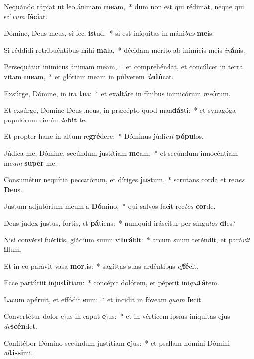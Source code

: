 \item Nequándo rápiat ut leo ánimam \textbf{me}am,~* dum non est qui rédimat, neque qui sal\textit{vum} \textbf{fá}\textbf{ci}at.
\item Dómine, Deus meus, si feci \textbf{is}tud.~* si est iníquitas in máni\textit{bus} \textbf{me}is:
\item Si réddidi retribuéntibus mihi \textbf{ma}la,~* décidam mérito ab inimícis meis \textit{in}\textbf{á}nis.
\item Persequátur inimícus ánimam meam,~† et comprehéndat, et concúlcet in terra vitam \textbf{me}am,~* et glóriam meam in púlverem \textit{de}\textbf{dú}cat.
\item Exsúrge, Dómine, in ira \textbf{tu}a:~* et exaltáre in fínibus inimicórum \textit{me}\textbf{ó}rum.
\item Et exsúrge, Dómine Deus meus, in præcépto quod man\textbf{dás}ti:~* et synagóga populórum circúm\textit{da}\textbf{bit} te.
\item Et propter hanc in altum re\textbf{gré}dere:~* Dóminus júdi\textit{cat} \textbf{pó}\textbf{pu}los.
\item Júdica me, Dómine, secúndum justítiam \textbf{me}am,~* et secúndum innocéntiam me\textit{am} \textbf{su}\textbf{per} me.
\item Consumétur nequítia peccatórum, et díriges \textbf{jus}tum,~* scrutans corda et re\textit{nes} \textbf{De}us.
\item Justum adjutórium meum a \textbf{Dó}mino,~* qui salvos facit rec\textit{tos} \textbf{cor}de.
\item Deus judex justus, fortis, et \textbf{pá}tiens:~* numquid iráscitur per síngu\textit{los} \textbf{di}es?
\item Nisi convérsi fuéritis, gládium suum vi\textbf{brá}bit:~* arcum suum teténdit, et pará\textit{vit} \textbf{il}lum.
\item Et in eo parávit vasa \textbf{mor}tis:~* sagíttas suas ardéntibus \textit{ef}\textbf{fé}cit.
\item Ecce partúriit injus\textbf{tí}tiam:~* concépit dolórem, et péperit ini\textit{qui}\textbf{tá}tem.
\item Lacum apéruit, et effódit \textbf{e}um:~* et íncidit in fóveam \textit{quam} \textbf{fe}cit.
\item Convertétur dolor ejus in caput \textbf{e}jus:~* et in vérticem ipsíus iníquitas ejus \textit{de}\textbf{scén}det.
\item Confitébor Dómino secúndum justítiam \textbf{e}jus:~* et psallam nómini Dómini \textit{al}\textbf{tís}\textbf{si}mi.
